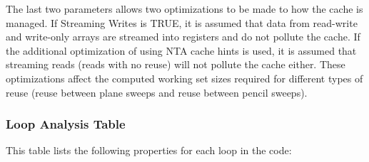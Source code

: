 \documentclass{article}
\begin{document}
The last two parameters allows two optimizations to be made to how the
cache is managed.  If Streaming Writes is TRUE, it is assumed that data
from read-write and write-only arrays are streamed into registers and
do not pollute the cache.  If the additional optimization of using NTA
cache hints is used, it is assumed that streaming reads (reads with no
reuse) will not pollute the cache either.  These optimizations affect
the computed working set sizes required for different types of reuse
(reuse between plane sweeps and reuse between pencil sweeps).

\subsubsection{Loop Analysis Table}

This table lists the following properties for each loop in the code:
\end{document}
